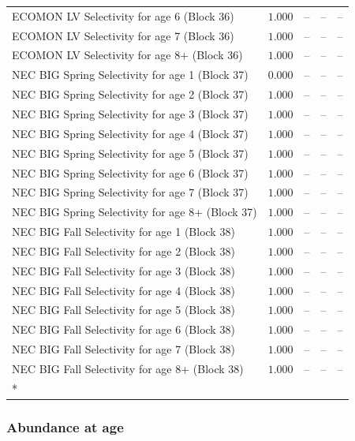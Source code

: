 \documentclass[
]{article}
\begin{document}
\begin{landscape}
\begin{longtable}[t]{lrrrr}
ECOMON LV Selectivity for age 6 (Block 36) & $1.000$ & -- & -- & --\\
ECOMON LV Selectivity for age 7 (Block 36) & $1.000$ & -- & -- & --\\
ECOMON LV Selectivity for age 8+ (Block 36) & $1.000$ & -- & -- & --\\
NEC BIG Spring Selectivity for age 1 (Block 37) & $0.000$ & -- & -- & --\\
\addlinespace
NEC BIG Spring Selectivity for age 2 (Block 37) & $1.000$ & -- & -- & --\\
NEC BIG Spring Selectivity for age 3 (Block 37) & $1.000$ & -- & -- & --\\
NEC BIG Spring Selectivity for age 4 (Block 37) & $1.000$ & -- & -- & --\\
NEC BIG Spring Selectivity for age 5 (Block 37) & $1.000$ & -- & -- & --\\
NEC BIG Spring Selectivity for age 6 (Block 37) & $1.000$ & -- & -- & --\\
\addlinespace
NEC BIG Spring Selectivity for age 7 (Block 37) & $1.000$ & -- & -- & --\\
NEC BIG Spring Selectivity for age 8+ (Block 37) & $1.000$ & -- & -- & --\\
NEC BIG Fall Selectivity for age 1 (Block 38) & $1.000$ & -- & -- & --\\
NEC BIG Fall Selectivity for age 2 (Block 38) & $1.000$ & -- & -- & --\\
NEC BIG Fall Selectivity for age 3 (Block 38) & $1.000$ & -- & -- & --\\
\addlinespace
NEC BIG Fall Selectivity for age 4 (Block 38) & $1.000$ & -- & -- & --\\
NEC BIG Fall Selectivity for age 5 (Block 38) & $1.000$ & -- & -- & --\\
NEC BIG Fall Selectivity for age 6 (Block 38) & $1.000$ & -- & -- & --\\
NEC BIG Fall Selectivity for age 7 (Block 38) & $1.000$ & -- & -- & --\\
NEC BIG Fall Selectivity for age 8+ (Block 38) & $1.000$ & -- & -- & --\\*
\end{longtable}
\end{landscape}

\subsubsection{Abundance at age}\label{abundance-at-age}
\end{document}
